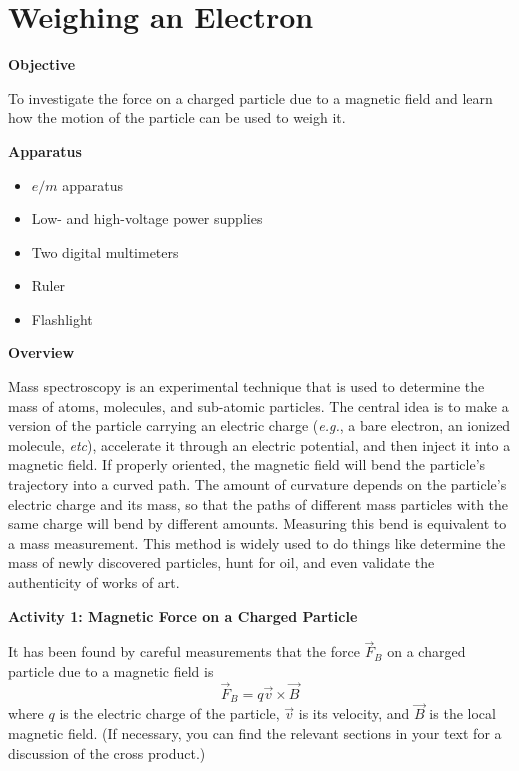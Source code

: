 \section{Weighing an Electron}

\makelabheader %

\bigskip
\textbf{Objective}

To investigate the force on a charged particle due to a magnetic field and 
learn how the motion of the particle can be used to weigh it.

\bigskip
\textbf{Apparatus}

\begin{itemize}[nosep]

\item $e/m$ apparatus

\item Low- and high-voltage power supplies

\item Two digital multimeters

\item Ruler

\item Flashlight

\end{itemize}

\medskip
\textbf{Overview}

Mass spectroscopy is an experimental technique that is used to determine
the mass of atoms, molecules, and sub-atomic particles.
The central idea is to make a version of the particle carrying an electric
charge ({\it e.g.}, a bare electron, an ionized molecule, {\it etc}), accelerate it
through an electric potential, and then inject it into a magnetic field.
If properly oriented, the magnetic field will bend the particle's trajectory into
a curved path.
The amount of curvature depends on the particle's electric
charge and its mass, so that the paths of different mass particles with the same charge will
bend by different amounts.
Measuring this bend is equivalent to a mass measurement.
This method is widely used to do things like determine the mass of newly discovered particles,
hunt for oil, and even validate the authenticity of works of art.

\bigskip
\textbf{Activity 1: Magnetic Force on a Charged Particle}

It has been found by careful measurements that the force $\vec F_B$ on a charged
particle due to a magnetic field is
\begin{equation}
\vec F_B = q \vec v \times \vec B
\end{equation}
where $q$ is the electric charge of the particle, $\vec v$ is its velocity,
and $\vec B$ is the local magnetic field.
(If necessary, you can find the relevant sections in your text for a discussion of the cross product.)

